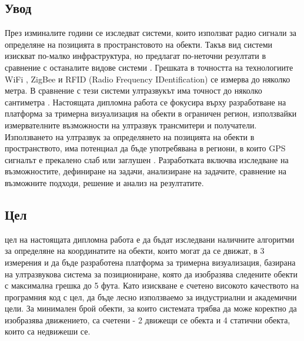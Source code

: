 \subsection{Увод}
\tab През изминалите години се изследват системи, които използват радио сигнали за определяне на позицията в пространстовото на обекти. Такъв вид системи изискват по-малко инфраструктура, но предлагат по-неточни резултати в сравнение с останалите видове системи \cite{CarlosMedina}. Грешката в точността на технологиите WiFi \cite{wifi}, ZigBee \cite{zigbee} и RFID (Radio Frequency IDentification) \cite{rfid} се измерва до няколко метра. В сравнение с тези системи ултразвукът има точност до няколко сантиметра \cite{CarlosMedina} \cite{columbia}. Настоящата дипломна работа се фокусира върху разработване на платформа за тримерна визуализация на обекти в ограничен регион, използвайки измервателните възможности на ултразвук трансмитери и получатели. Използването на ултразвук за определянето на позицията на обекти в пространството, има потенциал да бъде употребявана в региони, в които GPS сигналът е прекалено слаб или заглушен \cite{yonei}. Разработката включва изследване на възможностите, дефиниране на задачи, анализиране на задачите, сравнение на възможните подходи, решение и анализ на резултатите. 

\subsection{Цел}
 цел на настоящата дипломна работа е да бъдат изследвани наличните алгоритми за определяне на координатите на обекти, които могат да се движат, в 3 измерения и да бъде разработена платформа за тримерна визуализация, базирана на ултразвукова система за позициониране, която да изобразява следените обекти с максимална грешка до 5 фута. Като изискване е счетено високото качеството на програмния код с цел, да бъде лесно използваемо за индустриални и академични цели. За минимален брой обекти, за които системата трябва да може коректно да изобразява движението, са счетени - 2 движещи се обекта и 4 статични обекта, които са недвижеши се.

